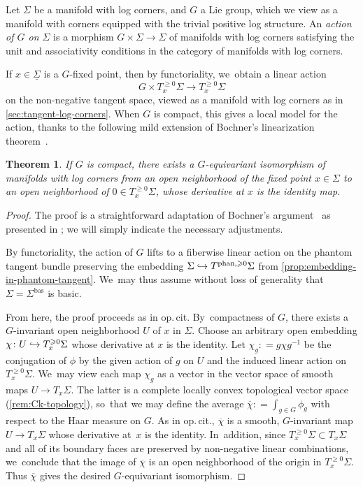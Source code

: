 \documentclass[10pt]{amsart}
\newcommand\hto{\mathrel{\lhook\joinrel\to}}
\newtheorem{theorem}{Theorem}[section]
\theoremstyle{definition}
\theoremstyle{remark}
\let\defn\emph
\renewcommand{\ge}{\geqslant}
\newcommand{\defas}{\mathrel{\mathop:}=}
\newcommand{\Sig}{\Sigma}
\newcommand{\uSig}{\underline{\Sigma}}
\newcommand{\bas}[1]{{#1}^{\mathrm{bas}}}
\newcommand{\phant}{\mathrm{phan}}
\newcommand{\Sigbas}{\bas{\Sig}}
\newcommand{\tb}[2][]{T_{#1}#2}
\newcommand{\tbge}[2][]{T^{\ge0}_{#1}#2}
\newcommand{\tbgephan}[2][]{T^{\phant,\ge0}_{#1}#2}
\begin{document}
\begin{definition}
Let $\Sig$ be a manifold with log corners, and $G$ a Lie group, which we view as a manifold with corners equipped with the trivial positive log structure. An \defn{action of $G$ on $\Sig$} is a morphism $G \times \Sig \to \Sig$ of manifolds with log corners satisfying the unit and associativity conditions in the category of manifolds with log corners.
\end{definition}

If $x \in \uSig$ is a $G$\nobreakdash-fixed point, then by functoriality, we~obtain a linear action
\[
G \times \tbge[x]{\Sig} \to \tbge[x]{\Sig}
\]
on the non-negative tangent space, viewed as a manifold with log corners as in \autoref{sec:tangent-log-corners}. When $G$ is compact, this gives a local model for the action, thanks to the following mild extension of Bochner's linearization theorem~\cite{Bochner1945}.
\begin{theorem}
If $G$ is compact, there exists a $G$\nobreakdash-equivariant isomorphism of manifolds with log corners from an open neighborhood of the fixed point $x \in \Sig$ to an open neighborhood of $0 \in \tbge[x]{\Sig}$, whose derivative at $x$ is the identity map.
\end{theorem}
\begin{proof}
The proof is a straightforward adaptation of Bochner's argument~\cite{Bochner1945} as presented in \cite[\S 2.2]{DuistermaatKolk}; we will simply indicate the necessary adjustments.

By functoriality, the action of $G$ lifts to a fiberwise linear action on the phantom tangent bundle preserving the embedding $\Sig\hto \tbgephan{\Sig}$ from \autoref{prop:embedding-in-phantom-tangent}. We~may thus assume without loss of generality that $\Sig = \Sigbas$ is basic.

From here, the proof proceeds as in {op.\,cit.} By~compactness of $G$, there exists a $G$\nobreakdash-invariant open neighborhood $U$ of $x$ in $\Sig$.
Choose an arbitrary open embedding $\chi\colon U \hto \tbge[x]{\Sig}$ whose derivative at $x$ is the identity. Let $\chi_g \defas g \chi g^{-1}$ be the conjugation of $\phi$ by the given action of $g$ on $U$ and the induced linear action on $\tbge[x]{\Sig}$. We~may view each map $\chi_g$ as a vector in the vector space of smooth maps $U \to \tb[x]{\Sig}$.
The latter is a complete locally convex topological vector space (\cf \autoref{rem:Ck-topology}), so~that we may define the average $\overline{\chi} \defas \int_{g \in G} \phi_g$ with respect to the Haar measure on $G$. As in {op.\,cit.}, $\overline{\chi}$ is a smooth, $G$\nobreakdash-invariant map $U \to \tb[x]{\Sig}$ whose derivative at~$x$ is the identity. In~addition, since $\tbge[x]{\Sig}\subset\tb[x]{\Sig}$ and all of its boundary faces are preserved by non-negative linear combinations, we~conclude that the image of $\overline{\chi}$ is an open neighborhood of the origin in $\tbge[x]{\Sig}$. Thus $\overline{\chi}$ gives the desired $G$\nobreakdash-equivariant isomorphism.
\end{proof}
\end{document}
